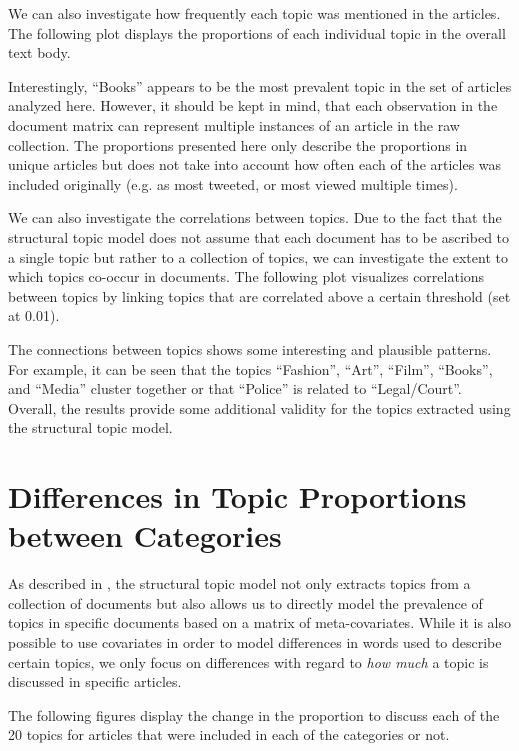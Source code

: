 \documentclass[12pt]{article}
\begin{document}
\begin{doublespace}
We can also investigate how frequently each topic was mentioned in the articles. The following plot displays the proportions of each individual topic in the overall text body.


Interestingly, ``Books'' appears to be the most prevalent topic in the set of articles analyzed here. However, it should be kept in mind, that each observation in the document matrix can represent multiple instances of an article in the raw collection. The proportions presented here only describe the proportions in unique articles but does not take into account how often each of the articles was included originally (e.g. as most tweeted, or most viewed multiple times). 

We can also investigate the correlations between topics. Due to the fact that the structural topic model does not assume that each document has to be ascribed to a single topic but rather to a collection of topics, we can investigate the extent to which topics co-occur in documents. The following plot visualizes correlations between topics by linking topics that are correlated above a certain threshold (set at 0.01).


The connections between topics shows some interesting and plausible patterns. For example, it can be seen that the topics ``Fashion'', ``Art'', ``Film'', ``Books'', and ``Media'' cluster together or that ``Police'' is related to ``Legal/Court''. Overall, the results provide some additional validity for the topics extracted using the structural topic model.


\section{Differences in Topic Proportions between Categories}

As described in \citet{roberts2014structural}, the structural topic model not only extracts topics from a collection of documents but also allows us to directly model the prevalence of topics in specific documents based on a matrix of meta-covariates. While it is also possible to use covariates in order to model differences in words used to describe certain topics, we only focus on differences with regard to \textit{how much} a topic is discussed in specific articles.

The following figures display the change in the proportion to discuss each of the 20 topics for articles that were included in each of the categories or not.




\end{doublespace}
\end{document}
